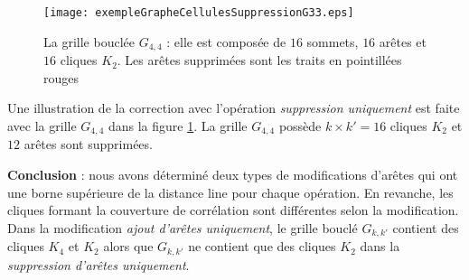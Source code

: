 \begin{figure}[htb!] 
\centering
\texttt{[image: exempleGrapheCellulesSuppressionG33.eps]}
\caption{ La grille boucl\'ee $G_{4,4}$ : elle est compos\'ee de $16$ sommets, $16$ ar\^etes et $16$ cliques $K_2$. Les ar\^etes supprim\'ees sont les traits en pointill\'ees rouges }
\label{exempleCorrectionGrapheCelluleAvecSuppression}
\end{figure}
Une illustration de la correction avec l'op\'eration {\em suppression uniquement} est faite avec la grille $G_{4,4}$ dans la figure \ref{exempleCorrectionGrapheCelluleAvecSuppression}.
La grille $G_{4,4}$ poss\`ede $ k \times k' = 16$ cliques $K_2$ et $12$ ar\^etes sont supprim\'ees.
\newline

{\bf Conclusion} :
nous avons d\'etermin\'e deux types de modifications d'ar\^etes qui ont une borne sup\'erieure de la distance line pour chaque op\'eration. En revanche, les cliques formant la couverture de corr\'elation sont diff\'erentes selon la modification. Dans la modification {\em ajout d'ar\^etes uniquement}, le grille boucl\'e $G_{k,k'}$ contient des cliques $K_4$ et $K_2$ alors que  $G_{k,k'}$ ne contient que des cliques $K_2$ dans la {\em suppression d'ar\^etes uniquement}. 



